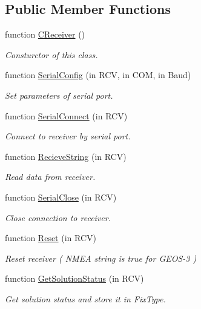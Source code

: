 \subsection*{Public Member Functions}
\begin{DoxyCompactItemize}
\item 
function \hyperlink{class_c_receiver_a6056c0c1f4f2ce1306e5068cafc27231}{C\-Receiver} ()
\begin{DoxyCompactList}\small\item\em Consturctor of this class. \end{DoxyCompactList}\item 
function \hyperlink{class_c_receiver_abb26454266315d70b8cd980440131b2c}{Serial\-Config} (in R\-C\-V, in C\-O\-M, in Baud)
\begin{DoxyCompactList}\small\item\em Set parameters of serial port. \end{DoxyCompactList}\item 
function \hyperlink{class_c_receiver_a1d8dc5af14b27f0abc720e0bc60e5903}{Serial\-Connect} (in R\-C\-V)
\begin{DoxyCompactList}\small\item\em Connect to receiver by serial port. \end{DoxyCompactList}\item 
function \hyperlink{class_c_receiver_a05982a8b657d04cebc74f39a6737a523}{Recieve\-String} (in R\-C\-V)
\begin{DoxyCompactList}\small\item\em Read data from receiver. \end{DoxyCompactList}\item 
function \hyperlink{class_c_receiver_a998ae45117346e1ab1fb5511d5fe295d}{Serial\-Close} (in R\-C\-V)
\begin{DoxyCompactList}\small\item\em Close connection to receiver. \end{DoxyCompactList}\item 
function \hyperlink{class_c_receiver_a24d9be27941e8c593a588df56f0cafe1}{Reset} (in R\-C\-V)
\begin{DoxyCompactList}\small\item\em Reset receiver ( N\-M\-E\-A string is true for G\-E\-O\-S-\/3 ) \end{DoxyCompactList}\item 
function \hyperlink{class_c_receiver_a18db451b4401eafbd75f549b880426b6}{Get\-Solution\-Status} (in R\-C\-V)
\begin{DoxyCompactList}\small\item\em Get solution status and store it in Fix\-Type. \end{DoxyCompactList}\end{DoxyCompactItemize}
